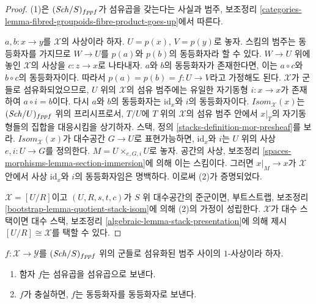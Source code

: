\begin{proof}
(1)은 $(\mathit{Sch}/S)_{fppf}$가 섬유곱을 갖는다는 사실과
범주, 보조정리
\ref{categories-lemma-fibred-groupoids-fibre-product-goes-up}에서 따른다.

\medskip\noindent
$a, b : x \to y$를 $\mathcal{X}$의 사상이라 하자.
$U = p(x)$, $V = p(y)$로 놓자. 스킴의 범주는 동등화자를 가지므로
$W \to U$를 $p(a)$와 $p(b)$의 동등화자라 할 수 있다.
$W \to U$ 위에 놓인 $\mathcal{X}$의 사상을 $c : z \to x$로 나타내자.
$a$와 $b$의 동등화자가 존재한다면, 이는 $a \circ c$와
$b \circ c$의 동등화자이다. 따라서
$p(a) = p(b) = f : U \to V$라고 가정해도 된다.
$\mathcal{X}$가 군들로 섬유화되었으므로, $U$ 위의
$\mathcal{X}$의 섬유 범주에는 유일한 자기동형
$i : x \to x$가 존재하여 $a \circ i = b$이다.
다시 $a$와 $b$의 동등화자는 $\text{id}_x$와 $i$의 동등화자이다.
$\mathit{Isom}_\mathcal{X}(x)$는 $(\mathit{Sch}/U)_{fppf}$ 위의
프리시프로서, $T/U$에 $T$ 위의 $\mathcal{X}$의 섬유 범주 안에서
$x|_T$의 자기동형들의 집합을 대응시킴을 상기하자.
스택, 정의 \ref{stacks-definition-mor-presheaf}를 보라.
$\mathit{Isom}_\mathcal{X}(x)$가 대수공간 $G \to U$로 표현가능하면,
$\text{id}_x$와 $i$는 $U$ 위의 사상 $e, i : U \to G$를 정의한다.
$M = U \times_{e, G, i} U$로 놓자. 공간의 사상, 보조정리
\ref{spaces-morphisms-lemma-section-immersion}에 의해 이는 스킴이다.
그러면 $x|_M \to x$가 $\mathcal{X}$ 안에서 사상 $\text{id}_x$와
$i$의 동등화자임은 명백하다. 이로써 (2)가 증명되었다.

\medskip\noindent
$\mathcal{X} = [U/R]$이고 $(U, R, s, t, c)$가 $S$ 위 대수공간의
준군이면, 부트스트랩, 보조정리
\ref{bootstrap-lemma-quotient-stack-isom}에 의해 (2)의 가정이 성립한다.
$\mathcal{X}$가 대수 스택이면 대수 스택, 보조정리
\ref{algebraic-lemma-stack-presentation}에 의해 제시
$[U/R] \cong \mathcal{X}$를 택할 수 있다.
\end{proof}

\begin{lemma}
\label{lemma-fibre-products-morphism}
$f : \mathcal{X} \to \mathcal{Y}$를 $(\mathit{Sch}/S)_{fppf}$ 위의
군들로 섬유화된 범주 사이의 $1$-사상이라 하자.
\begin{enumerate}
\item 함자 $f$는 섬유곱을 섬유곱으로 보낸다.
\item $f$가 충실하면, $f$는 동등화자를 동등화자로 보낸다.
\end{enumerate}
\end{lemma}

